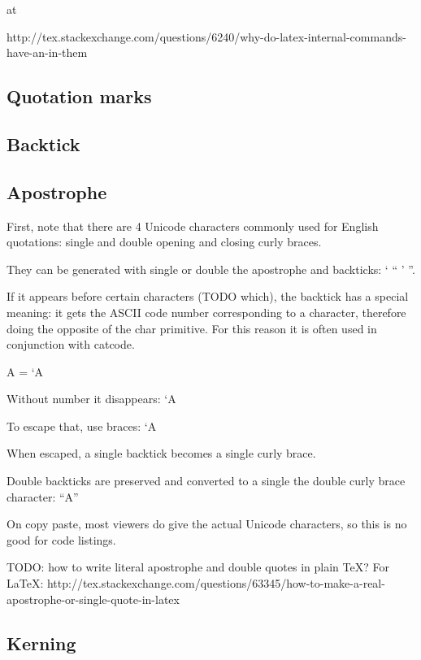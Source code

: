     \def\@{at}

    \@

    http://tex.stackexchange.com/questions/6240/why-do-latex-internal-commands-have-an-in-them

  \subsection{Quotation marks}

  \subsection{Backtick}

  \subsection{Apostrophe}

    First, note that there are 4 Unicode characters commonly used for English quotations: single and double opening and closing curly braces.

    They can be generated with single or double the apostrophe and backticks: ` `` ' ''.

    If it appears before certain characters (TODO which), the backtick has a special meaning: it gets the ASCII code number corresponding to a character, therefore doing the opposite of the \bs char primitive. For this reason it is often used in conjunction with \bs catcode.

    A = \number`A

    Without \bs number it disappears: `A

    To escape that, use braces: {`}A

    When escaped, a single backtick becomes a single curly brace.

    Double backticks are preserved and converted to a single the double curly brace character: ``A''

    On copy paste, most viewers do give the actual Unicode characters, so this is no good for code listings.

    TODO: how to write literal apostrophe and double quotes in plain \TeX? For LaTeX: http://tex.stackexchange.com/questions/63345/how-to-make-a-real-apostrophe-or-single-quote-in-latex

  \subsection{Kerning}

